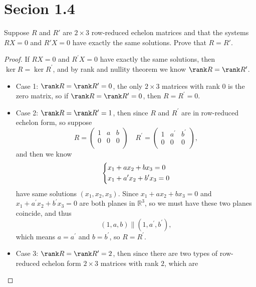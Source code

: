 \section*{Secion 1.4}
\begin{problem}
Suppose $R$ and $R'$ are $2\times 3$ row-reduced echelon matrices and that the systems $R X = 0$ and $R' X = 0$ have exactly the same solutions. Prove that $R=R'$.
\end{problem}
\begin{proof}
    If \(RX = 0\) and \(R^{\prime} X = 0\) have exactly the same solutions, then \(\ker R = \ker R^{\prime} \), and by rank and nullity theorem we know \(\rank R = \rank R^{\prime} \). 
    \begin{itemize}
        \item Case 1: \(\rank R = \rank R^{\prime} = 0\), the only \(2 \times 3\) matrices with rank \(0\) is the zero matrix, so if \(\rank R = \rank R^{\prime} = 0\), then \(R = R^{\prime} = 0\). 
        \item Case 2: \(\rank R = \rank R^{\prime} = 1\), then since \(R\) and \(R^{\prime} \) are in row-reduced echelon form, so suppose 
        \[
            R = \begin{pmatrix}
                1 & a & b  \\
                0 & 0 & 0  \\
            \end{pmatrix} \quad R^{\prime} = \begin{pmatrix}
                1 & a^{\prime}  & b^{\prime}   \\
                0& 0 & 0  \\
            \end{pmatrix},
        \] and then we know 
        \[
            \begin{dcases}
                x_1 + ax_2 + bx_3 = 0 \\
                x_1 + a^{\prime} x_2 + b^{\prime} x_3 = 0
            \end{dcases}
        \]
        have same solutions \((x_1, x_2, x_3)\). Since \(x_1 + ax_2 + bx_3 = 0\) and \(x_1 + a^{\prime} x_2 + b^{\prime} x_3 = 0\) are both planes in \(\mathbb{R} ^3\), so we must have these two planes coincide, and thus 
        \[
            (1, a, b) \parallel \left( 1, a^{\prime} , b^{\prime}  \right), 
        \] which means \(a = a^{\prime} \) and \(b = b^{\prime} \), so \(R = R^{\prime} \). 
        \item Case 3: \(\rank R = \rank R^{\prime} = 2\), then since there are two types of row-reduced echelon form \(2 \times 3\) matrices with rank \(2\), which are 

\end{itemize}
\end{proof}
